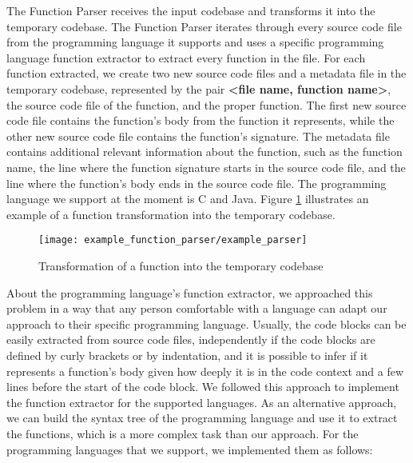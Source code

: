 The Function Parser receives the input codebase and transforms it into the temporary codebase. The 
Function Parser iterates through every source code file from the programming language it supports 
and uses a specific programming language function extractor to extract every function in the file. 
For each function extracted, we create two new source code files and a metadata file in the temporary 
codebase, represented by the pair \textbf{<file name, function name>},  the source code file of the function, and the proper function. 
The first new source code file contains the function’s body from the function it represents, while 
the other new source code file contains the function’s signature. The metadata file contains 
additional relevant information about the function, such as the function name, the line where the 
function signature starts in the source code file, and the line where the function’s body ends in 
the source code file. The programming language we support at the moment is C and Java. 
Figure \ref{fig:transform} illustrates an example of a function transformation into the 
temporary codebase.

\begin{figure}
\texttt{[image: example\_function\_parser/example\_parser]}
\caption{Transformation of a function into the temporary codebase}
\label{fig:transform}
\end{figure}

About the programming language’s function extractor, we approached this problem in a way that any 
person comfortable with a language can adapt our approach to their specific programming language. 
Usually, the code blocks can be easily extracted from source code files, independently if the code 
blocks are defined by curly brackets or by indentation, and it is possible to infer if it represents 
a function’s body given how deeply it is in the code context and a few lines before the start of the 
code block. We followed this approach to implement the function extractor for the supported languages. 
As an alternative approach, we can build the syntax tree \citep{compiler} 
of the programming language and use it to extract the functions, which is a more complex task than 
our approach. For the programming languages that we support, we implemented them as follows:

